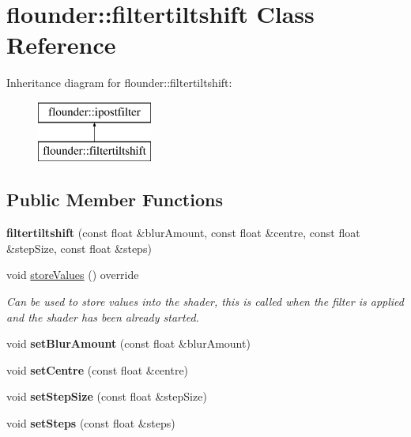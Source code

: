 \hypertarget{classflounder_1_1filtertiltshift}{}\section{flounder\+:\+:filtertiltshift Class Reference}
\label{classflounder_1_1filtertiltshift}
Inheritance diagram for flounder\+:\+:filtertiltshift\+:\begin{figure}[H]
\begin{center}
\leavevmode
\includegraphics[height=2.000000cm]{classflounder_1_1filtertiltshift}
\end{center}
\end{figure}
\subsection*{Public Member Functions}
\begin{DoxyCompactItemize}
\item 
\mbox{\label{classflounder_1_1filtertiltshift_acdbc3c02bf3fe5314910e2ebb257d6db}} 
{\bfseries filtertiltshift} (const float \&blur\+Amount, const float \&centre, const float \&step\+Size, const float \&steps)
\item 
void \hyperlink{classflounder_1_1filtertiltshift_a8e04e52da882a2d78d7a0e1f70717114}{store\+Values} () override
\begin{DoxyCompactList}\small\item\em Can be used to store values into the shader, this is called when the filter is applied and the shader has been already started. \end{DoxyCompactList}\item 
\mbox{\label{classflounder_1_1filtertiltshift_a9064ec6b0c0e487906c05d494bf6512c}} 
void {\bfseries set\+Blur\+Amount} (const float \&blur\+Amount)
\item 
\mbox{\label{classflounder_1_1filtertiltshift_ac45be454076e04bc350870eacb645b82}} 
void {\bfseries set\+Centre} (const float \&centre)
\item 
\mbox{\label{classflounder_1_1filtertiltshift_a013a784c2e5a9703ce93420b45e06120}} 
void {\bfseries set\+Step\+Size} (const float \&step\+Size)
\item 
\mbox{\label{classflounder_1_1filtertiltshift_a844d3051718025c35600ce7a79e01b89}} 
void {\bfseries set\+Steps} (const float \&steps)
\end{DoxyCompactItemize}
